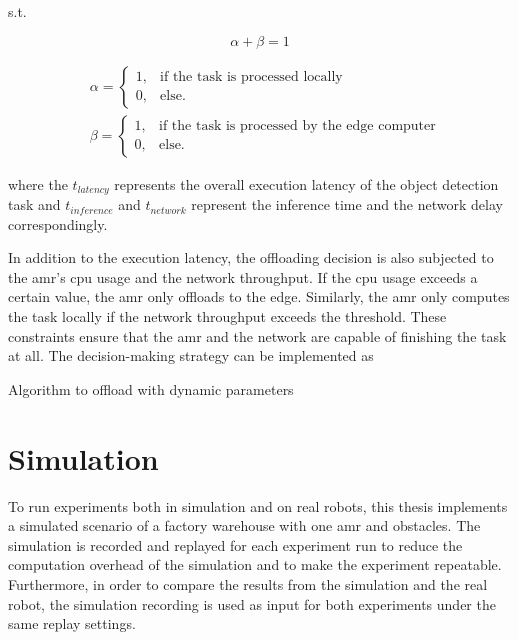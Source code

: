 s.t.

\begin{equation*}
    \alpha + \beta = 1
\end{equation*}

\begin{align*}
    & \alpha = \begin{cases}
        1, & \text{if the task is processed locally} \\
        0, & \text{else.}
    \end{cases} \\
    & \beta = \begin{cases}
        1, & \text{if the task is processed by the edge computer} \\
        0, & \text{else.}
    \end{cases}
\end{align*}

where the $t_{latency}$ represents the overall execution latency of the object detection task and $t_{inference}$ and $t_{network}$ represent the inference time and the network delay correspondingly. 

In addition to the execution latency, the offloading decision is also subjected to the \gls{amr}'s \gls{cpu} usage and the network throughput. If the \gls{cpu} usage exceeds a certain value, the \gls{amr} only offloads to the edge. Similarly, the \gls{amr} only computes the task locally if the network throughput exceeds the threshold. These constraints ensure that the \gls{amr} and the network are capable of finishing the task at all. The decision-making strategy can be implemented as 

\begin{algorithm}[htp]
\caption{Algorithm to offload with dynamic parameters}\label{alg:decision_making_strategy}
\begin{algorithmic}[1]
    \EndFunction
\end{algorithmic}
\end{algorithm}



\section{Simulation}\label{sec:general_setup:simulation}

To run experiments both in simulation and on real robots, this thesis implements a simulated scenario of a factory warehouse with one \gls{amr} and obstacles. The simulation is recorded and replayed for each experiment run to reduce the computation overhead of the simulation and to make the experiment repeatable. Furthermore, in order to compare the results from the simulation and the real robot, the simulation recording is used as input for both experiments under the same replay settings. 

